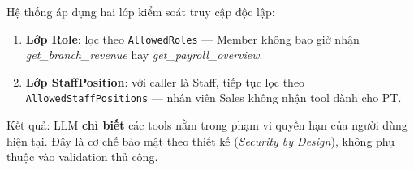 Hệ thống áp dụng hai lớp kiểm soát truy cập độc lập:

\begin{enumerate}
    \item \textbf{Lớp Role}: lọc theo \texttt{AllowedRoles} --- Member không bao giờ nhận \textit{get\_branch\_revenue} hay \textit{get\_payroll\_overview}.
    \item \textbf{Lớp StaffPosition}: với caller là Staff, tiếp tục lọc theo \texttt{AllowedStaffPositions} --- nhân viên Sales không nhận tool dành cho PT.
\end{enumerate}

Kết quả: LLM \textbf{chỉ biết} các tools nằm trong phạm vi quyền hạn của người dùng hiện tại. Đây là cơ chế bảo mật theo thiết kế (\textit{Security by Design}), không phụ thuộc vào validation thủ công.

